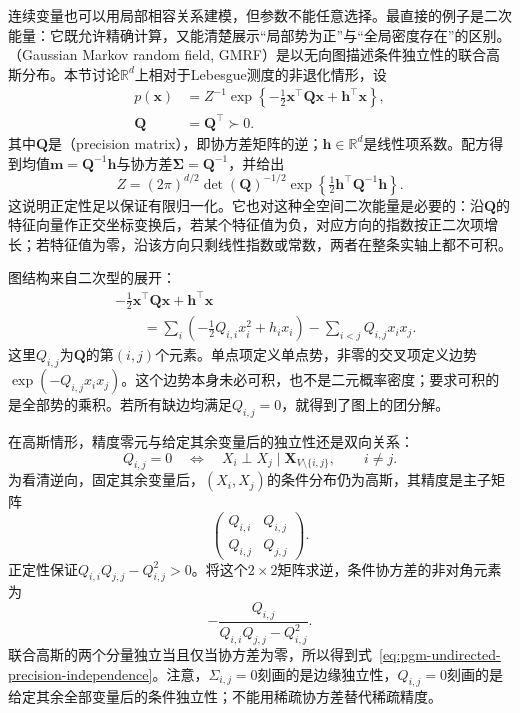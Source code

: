 连续变量也可以用局部相容关系建模，但参数不能任意选择。最直接的例子是二次能量：它既允许精确计算，又能清楚展示“局部势为正”与“全局密度存在”的区别。（Gaussian Markov random field, GMRF）是以无向图描述条件独立性的联合高斯分布。本节讨论$\mathbb{R}^d$上相对于Lebesgue测度的非退化情形，设
\begin{equation}
  \begin{aligned}
    p(\bm{x})&=Z^{-1}
      \exp\left\{-\tfrac12\bm{x}^{\top}\bm{Q}\bm{x}
                   +\bm{h}^{\top}\bm{x}\right\},\\
    \bm{Q}&=\bm{Q}^{\top}\succ0.
  \end{aligned}
  \label{eq:pgm-undirected-gaussian}
\end{equation}
其中$\bm{Q}$是（precision matrix），即协方差矩阵的逆；$\bm{h}\in\mathbb{R}^d$是线性项系数。配方得到均值$\bm{m}=\bm{Q}^{-1}\bm{h}$与协方差$\bm{\Sigma}=\bm{Q}^{-1}$，并给出
\begin{equation}
  Z=(2\pi)^{d/2}\det(\bm{Q})^{-1/2}
     \exp\left\{\tfrac12\bm{h}^{\top}\bm{Q}^{-1}\bm{h}\right\}.
  \label{eq:pgm-undirected-gaussian-partition}
\end{equation}
这说明正定性足以保证有限归一化。它也对这种全空间二次能量是必要的：沿$\bm{Q}$的特征向量作正交坐标变换后，若某个特征值为负，对应方向的指数按正二次项增长；若特征值为零，沿该方向只剩线性指数或常数，两者在整条实轴上都不可积。

图结构来自二次型的展开：
\[
  \begin{aligned}
    &-\tfrac12\bm{x}^{\top}\bm{Q}\bm{x}+\bm{h}^{\top}\bm{x}\\
    &\qquad=\sum_i\left(-\tfrac12 Q_{i,i}x_i^2+h_i x_i\right)
             -\sum_{i<j}Q_{i,j}x_i x_j.
  \end{aligned}
\]
这里$Q_{i,j}$为$\bm{Q}$的第$(i,j)$个元素。单点项定义单点势，非零的交叉项定义边势$\exp(-Q_{i,j}x_i x_j)$。这个边势本身未必可积，也不是二元概率密度；要求可积的是全部势的乘积。若所有缺边均满足$Q_{i,j}=0$，就得到了图上的团分解。

在高斯情形，精度零元与给定其余变量后的独立性还是双向关系：
\begin{equation}
  Q_{i,j}=0
  \quad\Longleftrightarrow\quad
  X_i\perp X_j\mid\bm{X}_{V\setminus\{i,j\}},
  \qquad i\neq j.
  \label{eq:pgm-undirected-precision-independence}
\end{equation}
为看清逆向，固定其余变量后，$(X_i,X_j)$的条件分布仍为高斯，其精度是主子矩阵
\[
  \begin{pmatrix}Q_{i,i}&Q_{i,j}\\Q_{i,j}&Q_{j,j}\end{pmatrix}.
\]
正定性保证$Q_{i,i}Q_{j,j}-Q_{i,j}^2>0$。将这个$2\times2$矩阵求逆，条件协方差的非对角元素为
\[
  -\frac{Q_{i,j}}{Q_{i,i}Q_{j,j}-Q_{i,j}^2}.
\]
联合高斯的两个分量独立当且仅当协方差为零，所以得到式~\eqref{eq:pgm-undirected-precision-independence}。注意，$\Sigma_{i,j}=0$刻画的是边缘独立性，$Q_{i,j}=0$刻画的是给定其余全部变量后的条件独立性；不能用稀疏协方差替代稀疏精度。

